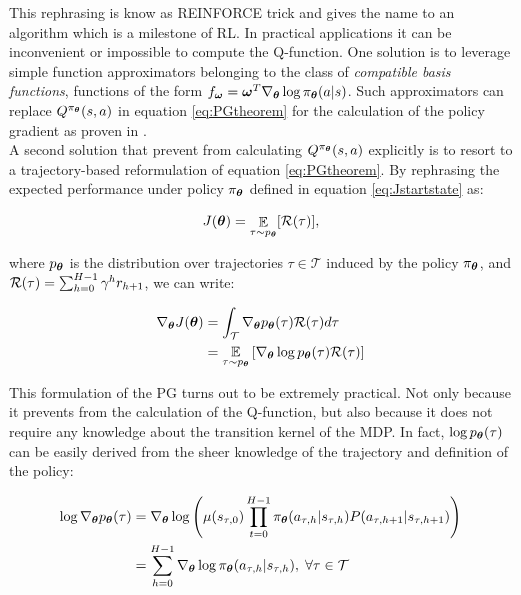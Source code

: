 This rephrasing is know as REINFORCE trick \cite{williams1992simple} and gives the name to an algorithm which is a milestone of \gls{RL}.
In practical applications it can be inconvenient or impossible to compute the Q-function. One solution is to leverage simple function approximators belonging to the class of \emph{compatible basis functions}, \ie functions of the form $f_{\boldsymbol{\omega}}=\boldsymbol{\omega}^{T}\nabla_{\boldsymbol{\theta}}\log\pi_{\boldsymbol{\theta}}(a|s)$. Such approximators can replace $Q^{\pi_{\boldsymbol{\theta}}}(s,a)$ in equation \ref{eq:PGtheorem} for the calculation of the policy gradient as proven in \cite{sutton2000policy}.\\
A second solution that prevent from calculating $Q^{\pi_{\boldsymbol{\theta}}}(s,a)$ explicitly is to resort to a trajectory-based reformulation of equation \ref{eq:PGtheorem}. By rephrasing the expected performance under policy $\pi_{\boldsymbol{\theta}}$ defined in equation \ref{eq:Jstartstate} as:

\begin{align}
J(\boldsymbol{\theta}) = \mathop{\mathbb{E}}_{\tau\sim p_{\boldsymbol{\theta}}}[\mathcal{R}(\tau)], 
\end{align}

where $p_{\boldsymbol{\theta}}$ is the distribution over trajectories $\tau\in\mathcal{T}$ induced by the policy $\pi_{\boldsymbol{\theta}}$, and $\mathcal{R}(\tau) = \sum_{h=0}^{H-1}\gamma^{h}r_{h+1}$, we can write: 

\begin{align}
\nabla_{\boldsymbol{\theta}}J(\boldsymbol{\theta}) 
&= \int_{\mathcal{T}}\nabla_{\boldsymbol{\theta}}p_{\boldsymbol{\theta}}(\tau)\mathcal{R}(\tau)d\tau \\
&= \underset{\tau\sim p_{\boldsymbol{\theta}}}{\mathbb{E}}\left[{\nabla_{\boldsymbol{\theta}}\log p_{\boldsymbol{\theta}}(\tau)\mathcal{R}(\tau)}\right] \label{eq:trajectoryPG}
\end{align}

This formulation of the \gls{PG} turns out to be extremely practical. Not only because it prevents from the calculation of the Q-function, but also because it does not require any knowledge about the transition kernel of the \gls{MDP}. In fact, $\log p_{\boldsymbol{\theta}}(\tau)$ can be easily derived from the sheer knowledge of the trajectory and definition of the policy:

\begin{align}
\log \nabla_{\boldsymbol{\theta}}p_{\boldsymbol{\theta}}(\tau) 
&= \nabla_{\boldsymbol{\theta}}\log\left( \mu(s_{\tau,0})\prod_{t=0}^{H-1}\pi_{\boldsymbol{\theta}}(a_{\tau,h}|s_{\tau,h})P(a_{\tau,h+1}|s_{\tau,h+1})\right) \\
&= \sum_{h=0}^{H-1}\nabla_{\boldsymbol{\theta}}\log\pi_{\boldsymbol{\theta}}(a_{\tau,h}|s_{\tau,h}), \; \forall \tau\in\mathcal{T} \label{eq:logpolicyestimate}
\end{align}

